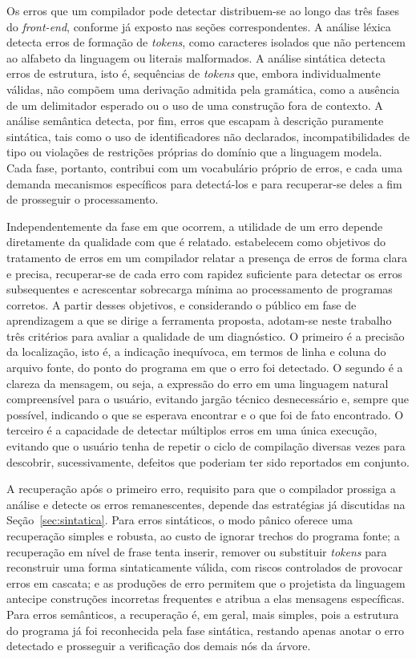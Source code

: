 \documentclass[
    12pt
    ,oneside
    ,a4paper
    ,chapter=TITLE
    ,section=TITLE
    ,sumario=abnt-6027-2012]{abntex2}
\begin{document}
Os erros que um compilador pode detectar distribuem-se ao longo das três fases do
\textit{front-end}, conforme já exposto nas seções correspondentes. A análise léxica detecta
erros de formação de \textit{tokens}, como caracteres isolados que não pertencem ao alfabeto da
linguagem ou literais malformados. A análise sintática detecta erros de estrutura, isto é,
sequências de \textit{tokens} que, embora individualmente válidas, não compõem uma derivação
admitida pela gramática, como a ausência de um delimitador esperado ou o uso de uma construção
fora de contexto. A análise semântica detecta, por fim, erros que escapam à descrição puramente
sintática, tais como o uso de identificadores não declarados, incompatibilidades de tipo ou
violações de restrições próprias do domínio que a linguagem modela. Cada fase, portanto,
contribui com um vocabulário próprio de erros, e cada uma demanda mecanismos específicos para
detectá-los e para recuperar-se deles a fim de prosseguir o processamento.

Independentemente da fase em que ocorrem, a utilidade de um erro depende diretamente da
qualidade com que é relatado.  estabelecem como objetivos do tratamento de
erros em um compilador relatar a presença de erros de forma clara e precisa, recuperar-se de
cada erro com rapidez suficiente para detectar os erros subsequentes e acrescentar sobrecarga
mínima ao processamento de programas corretos. A partir desses objetivos, e considerando o
público em fase de aprendizagem a que se dirige a ferramenta proposta, adotam-se neste trabalho
três critérios para avaliar a qualidade de um diagnóstico. O primeiro é a precisão da
localização, isto é, a indicação inequívoca, em termos de linha e coluna do arquivo fonte, do
ponto do programa em que o erro foi detectado. O segundo é a clareza da mensagem, ou
seja, a expressão do erro em uma linguagem natural compreensível para o usuário, evitando jargão
técnico desnecessário e, sempre que possível, indicando o que se esperava encontrar e o que foi
de fato encontrado. O terceiro é a capacidade de detectar múltiplos erros em uma única
execução, evitando que o usuário tenha de repetir o ciclo de compilação diversas vezes para
descobrir, sucessivamente, defeitos que poderiam ter sido reportados em conjunto.

A recuperação após o primeiro erro, requisito para que o compilador prossiga a análise e detecte
os erros remanescentes, depende das estratégias já discutidas na Seção~\ref{sec:sintatica}.
Para erros sintáticos, o modo pânico oferece uma recuperação simples e robusta, ao custo de
ignorar trechos do programa fonte; a recuperação em nível de frase tenta inserir, remover ou
substituir \textit{tokens} para reconstruir uma forma sintaticamente válida, com riscos
controlados de provocar erros em cascata; e as produções de erro permitem que o projetista
da linguagem antecipe construções incorretas frequentes e atribua a elas mensagens específicas.
Para erros semânticos, a recuperação é, em geral, mais simples, pois a estrutura do programa já
foi reconhecida pela fase sintática, restando apenas anotar o erro detectado e prosseguir a
verificação dos demais nós da árvore.
\end{document}
